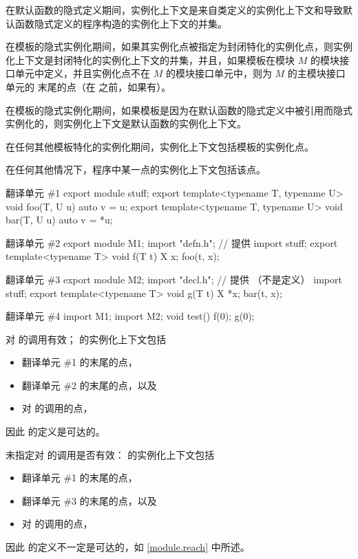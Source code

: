 \pnum
在默认函数的隐式定义期间，实例化上下文是来自类定义的实例化上下文和导致默认函数隐式定义的程序构造的实例化上下文的并集。

\pnum
在模板的隐式实例化期间，如果其实例化点被指定为封闭特化的实例化点，则实例化上下文是封闭特化的实例化上下文的并集，并且，如果模板在模块 $M$ 的模块接口单元中定义，并且实例化点不在 $M$ 的模块接口单元中，则为 $M$ 的主模块接口单元的  末尾的点（在  之前，如果有）。

\pnum
在模板的隐式实例化期间，如果模板是因为在默认函数的隐式定义中被引用而隐式实例化的，则实例化上下文是默认函数的实例化上下文。

\pnum
在任何其他模板特化的实例化期间，实例化上下文包括模板的实例化点。

\pnum
在任何其他情况下，程序中某一点的实例化上下文包括该点。

\pnum
\begin{example}
\begin{codeblocktu}{翻译单元 \#1}
export module stuff;
export template<typename T, typename U> void foo(T, U u) { auto v = u; }
export template<typename T, typename U> void bar(T, U u) { auto v = *u; }
\end{codeblocktu}

\begin{codeblocktu}{翻译单元 \#2}
export module M1;
import "defn.h";        // 提供 
import stuff;
export template<typename T> void f(T t) {
  X x;
  foo(t, x);
}
\end{codeblocktu}

\begin{codeblocktu}{翻译单元 \#3}
export module M2;
import "decl.h";        // 提供  （不是定义）
import stuff;
export template<typename T> void g(T t) {
  X *x;
  bar(t, x);
}
\end{codeblocktu}

\begin{codeblocktu}{翻译单元 \#4}
import M1;
import M2;
void test() {
  f(0);
  g(0);
}
\end{codeblocktu}
对  的调用有效； 的实例化上下文包括
\begin{itemize}
\item 翻译单元 \#1 的末尾的点，
\item 翻译单元 \#2 的末尾的点，以及
\item 对  的调用的点，
\end{itemize}
因此  的定义是可达的。

未指定对  的调用是否有效： 的实例化上下文包括
\begin{itemize}
\item 翻译单元 \#1 的末尾的点，
\item 翻译单元 \#3 的末尾的点，以及
\item 对  的调用的点，
\end{itemize}
因此  的定义不一定是可达的，如 \ref{module.reach} 中所述。
\end{example}

